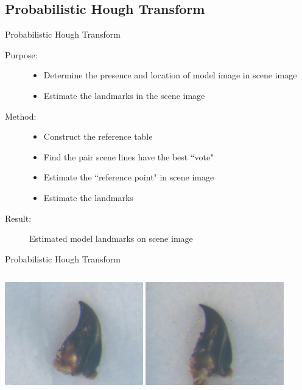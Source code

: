 \documentclass{beamer}
\begin{document}
\subsection{Probabilistic Hough Transform}
\begin{frame}{Probabilistic Hough Transform}
	\begin{description}
		\item[Purpose:]
			\begin{itemize}
				\item Determine the presence and location of model image in scene image
				\item Estimate the landmarks in the scene image
			\end{itemize}
		\item[Method:]
		\begin{itemize}
			\item Construct the reference table
			\item Find the pair scene lines have the best ``vote"
			\item Estimate the ``reference point" in scene image
			\item Estimate the landmarks
		\end{itemize}
		\item[Result:] Estimated model landmarks on scene image
	\end{description}
\end{frame}
\begin{frame}{Probabilistic Hough Transform}
	\begin{columns}[c]
		\includegraphics[height=4.5cm]{images/model28.JPG}
		\includegraphics[height=4.5cm]{images/pht32.JPG}
	\end{columns}
\end{frame}
\end{document}
